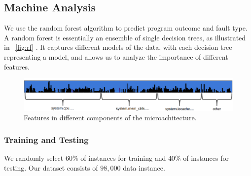 
\subsection{Machine Analysis}\label{section:ML}
We use the random forest algorithm to predict program outcome and fault type. A random forest is essentially an ensemble of single decision trees, as illustrated in ~\ref{fig:rf} \cite{breiman2001random}. It captures different models of the data, with each decision tree representing a model, and allows us to analyze the importance of different features. 



\begin{figure}[t]
\begin{center}
   \includegraphics[width=0.95\linewidth]{./figures/feat_dist.png}
\end{center}
   \caption{\footnotesize Features in different components of the microachitecture.}
   \vspace{-0.4cm}
\label{fig:feat-dist}
\end{figure}

\subsubsection{Training and Testing}
We randomly select $60\%$ of instances for training and $40\%$ of instances for testing. Our dataset consists of $98,000$ data instance.